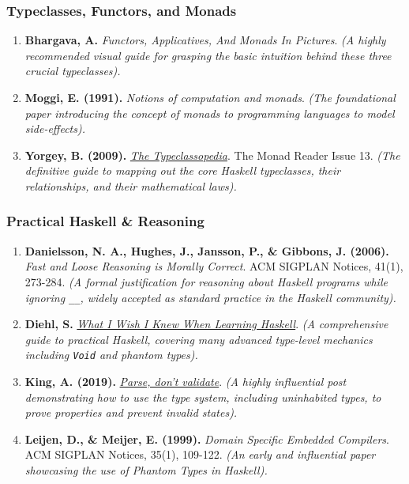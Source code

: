\documentclass[
]{article}
\providecommand{\tightlist}{%
  \setlength{\itemsep}{0pt}\setlength{\parskip}{0pt}}
\begin{document}
\subsubsection{Typeclasses, Functors, and
Monads}\label{typeclasses-functors-and-monads}

\begin{enumerate}
\def\labelenumi{\arabic{enumi}.}
\setcounter{enumi}{8}
\tightlist
\item
  \textbf{Bhargava, A.} \emph{Functors, Applicatives, And Monads In
  Pictures}. \emph{(A highly recommended visual guide for grasping the
  basic intuition behind these three crucial typeclasses).}
\item
  \textbf{Moggi, E. (1991).} \emph{Notions of computation and monads}.
  \emph{(The foundational paper introducing the concept of monads to
  programming languages to model side-effects).}
\item
  \textbf{Yorgey, B. (2009).}
  \emph{\href{https://wiki.haskell.org/Typeclassopedia}{The
  Typeclassopedia}}. The Monad Reader Issue 13. \emph{(The definitive
  guide to mapping out the core Haskell typeclasses, their
  relationships, and their mathematical laws).}
\end{enumerate}

\subsubsection{Practical Haskell \&
Reasoning}\label{practical-haskell-reasoning}

\begin{enumerate}
\def\labelenumi{\arabic{enumi}.}
\setcounter{enumi}{11}
\tightlist
\item
  \textbf{Danielsson, N. A., Hughes, J., Jansson, P., \& Gibbons, J.
  (2006).} \emph{Fast and Loose Reasoning is Morally Correct}. ACM
  SIGPLAN Notices, 41(1), 273-284. \emph{(A formal justification for
  reasoning about Haskell programs while ignoring
  \texttt{\_\textbar{}\_}, widely accepted as standard practice in the
  Haskell community).}
\item
  \textbf{Diehl, S.}
  \emph{\href{https://smunix.github.io/dev.stephendiehl.com/hask/tutorial.pdf}{What
  I Wish I Knew When Learning Haskell}}. \emph{(A comprehensive guide to
  practical Haskell, covering many advanced type-level mechanics
  including \texttt{Void} and phantom types).}
\item
  \textbf{King, A. (2019).}
  \emph{\href{https://lexi-lambda.github.io/blog/2019/11/05/parse-don-t-validate/}{Parse,
  don't validate}}. \emph{(A highly influential post demonstrating how
  to use the type system, including uninhabited types, to prove
  properties and prevent invalid states).}
\item
  \textbf{Leijen, D., \& Meijer, E. (1999).} \emph{Domain Specific
  Embedded Compilers}. ACM SIGPLAN Notices, 35(1), 109-122. \emph{(An
  early and influential paper showcasing the use of Phantom Types in
  Haskell).}
\end{enumerate}
\end{document}
